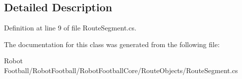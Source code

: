 \subsection{Detailed Description}


Definition at line 9 of file Route\-Segment.\-cs.



The documentation for this class was generated from the following file\-:\begin{DoxyCompactItemize}
\item 
Robot Football/\-Robot\-Football/\-Robot\-Football\-Core/\-Route\-Objects/Route\-Segment.\-cs\end{DoxyCompactItemize}
